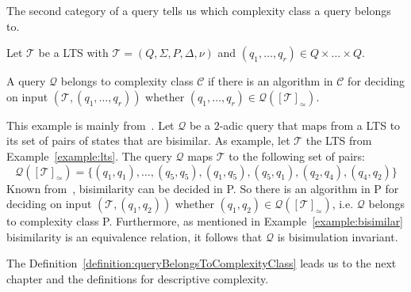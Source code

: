 The second category of a query tells us which complexity class a query belongs to.

\begin{definition}
    \label{definition:queryBelongsToComplexityClass}
    Let $\mathcal{T}$ be a LTS with $\mathcal{T} = (Q, \Sigma, P, \Delta, \nu)$ and $(q_1, \dots, q_{r}) \in Q \times
    \dots \times Q$.

    A query $\mathcal{Q}$ belongs to complexity class $\mathcal{C}$ if there is an algorithm in $\mathcal{C}$ for
    deciding on input $(\mathcal{T}, (q_1, \dots, q_{r}))$ whether $(q_1, \dots, q_{r}) \in \mathcal{Q}
    ([\mathcal{T}]_\simeq)$.
\end{definition}

\begin{example}
    This example is mainly from~\cite{lange2014capturing}. Let $\mathcal{Q}$ be a $2$-adic query that maps from a
    LTS to its set of pairs of states that are bisimilar. As example, let $\mathcal{T}$ the LTS from
    Example~\ref{example:lts}. The query $\mathcal{Q}$ maps $\mathcal{T}$ to the following set of pairs:
    \[\mathcal{Q}([\mathcal{T}]_\simeq) = \{(q_1, q_1), \dots, (q_5, q_5), (q_1, q_5), (q_5, q_1), (q_2, q_4), (q_4,
    q_2)\}\]
    Known from~\cite{lange2014capturing}, bisimilarity can be decided in P. So there is an algorithm in P for deciding on
    input $(\mathcal{T}, (q_1, q_2))$ whether $(q_1, q_2) \in \mathcal{Q}([\mathcal{T}]_\simeq)$, i.e. $\mathcal{Q}$
    belongs to complexity class P. Furthermore, as mentioned in Example~\ref{example:bisimilar} bisimilarity is an
    equivalence relation, it follows that $\mathcal{Q}$ is bisimulation invariant.
\end{example}

The Definition~\ref{definition:queryBelongsToComplexityClass} leads us to the next chapter and the definitions for
descriptive complexity.